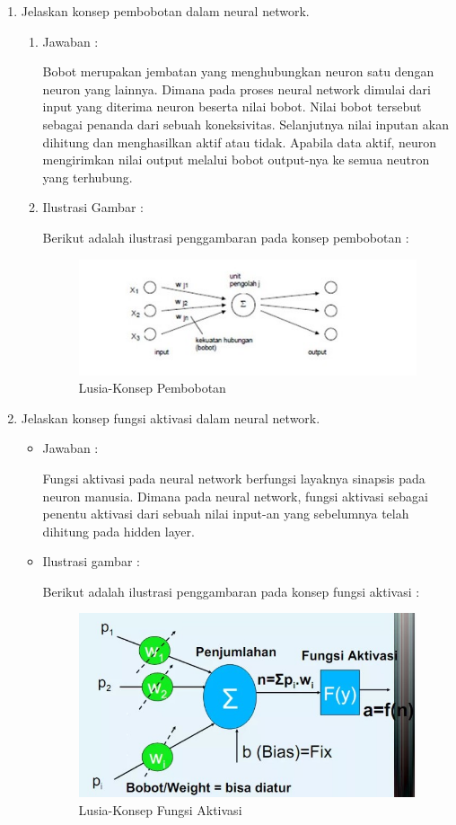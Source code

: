 \begin{enumerate}
\item Jelaskan konsep pembobotan dalam neural network.
	\begin{enumerate}
	\item Jawaban :
		\par Bobot merupakan jembatan yang menghubungkan neuron satu dengan neuron yang lainnya. Dimana pada proses neural network dimulai dari input yang diterima neuron beserta nilai bobot. Nilai bobot tersebut sebagai penanda dari sebuah koneksivitas. Selanjutnya nilai inputan akan dihitung dan menghasilkan aktif atau tidak. Apabila data aktif, neuron mengirimkan nilai output melalui bobot output-nya ke semua neutron yang terhubung. 
	\item Ilustrasi Gambar :
		\par Berikut adalah ilustrasi penggambaran pada konsep pembobotan :
		\begin{figure}[!hbtp]
		\centering
		\includegraphics[scale=0.4]{figures/s3.jpg}
		\caption{Lusia-Konsep Pembobotan}
		\label{6A3}
		\end{figure}
	\end{enumerate}
	
\item Jelaskan konsep fungsi aktivasi dalam neural network. 
	\begin{itemize}
	\item Jawaban :
		\par Fungsi aktivasi pada neural network berfungsi layaknya sinapsis pada neuron manusia. Dimana pada neural network, fungsi aktivasi sebagai penentu aktivasi dari sebuah nilai input-an yang sebelumnya telah dihitung pada hidden layer.
	\item Ilustrasi gambar :
		\par Berikut adalah ilustrasi penggambaran pada konsep fungsi aktivasi :
		\begin{figure}[!hbtp]
		\centering
		\includegraphics[scale=0.5]{figures/s4.jpg}
		\caption{Lusia-Konsep Fungsi Aktivasi}
		\label{6A4}
		\end{figure}
	\end{itemize}
	

\end{enumerate}
